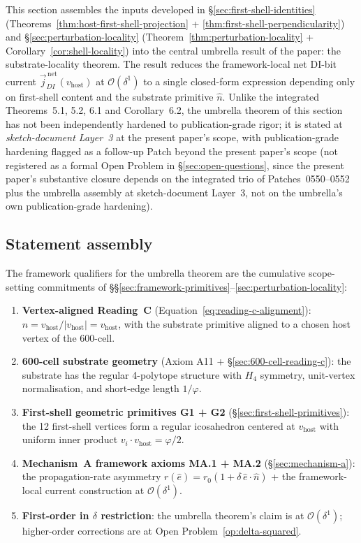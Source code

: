 \documentclass[11pt,letterpaper]{article}
\newcommand{\phig}{\varphi}
\newcommand{\vhost}{v_{\text{host}}}
\newcommand{\jDInet}{\vec{j}_{DI}^{\,\text{net}}}
\newcommand{\bigO}[1]{\mathcal{O}(#1)}
\begin{document}
This section assembles the inputs developed in \S\ref{sec:first-shell-identities} (Theorems~\ref{thm:host-first-shell-projection} + \ref{thm:first-shell-perpendicularity}) and \S\ref{sec:perturbation-locality} (Theorem~\ref{thm:perturbation-locality} + Corollary~\ref{cor:shell-locality}) into the central umbrella result of the paper: the substrate-locality theorem. The result reduces the framework-local net DI-bit current $\jDInet(\vhost)$ at $\bigO{\delta^1}$ to a single closed-form expression depending only on first-shell content and the substrate primitive $\hat{n}$. Unlike the integrated Theorems~5.1, 5.2, 6.1 and Corollary~6.2, the umbrella theorem of this section has not been independently hardened to publication-grade rigor; it is stated at \emph{sketch-document Layer~3} at the present paper's scope, with publication-grade hardening flagged as a follow-up Patch beyond the present paper's scope (not registered as a formal Open Problem in \S\ref{sec:open-questions}, since the present paper's substantive closure depends on the integrated trio of Patches~0550--0552 plus the umbrella assembly at sketch-document Layer~3, not on the umbrella's own publication-grade hardening).

\subsection{Statement assembly}
\label{sec:statement-assembly}

The framework qualifiers for the umbrella theorem are the cumulative scope-setting commitments of \S\S\ref{sec:framework-primitives}--\ref{sec:perturbation-locality}:

\begin{enumerate}[leftmargin=2em]
\item \textbf{Vertex-aligned Reading~C} (Equation~\eqref{eq:reading-c-alignment}): $\hat{n} = \vhost / |\vhost| = \vhost$, with the substrate primitive aligned to a chosen host vertex of the 600-cell.
\item \textbf{600-cell substrate geometry} (Axiom A11 + \S\ref{sec:600-cell-reading-c}): the substrate has the regular 4-polytope structure with $H_4$ symmetry, unit-vertex normalisation, and short-edge length $1/\phig$.
\item \textbf{First-shell geometric primitives G1 + G2} (\S\ref{sec:first-shell-primitives}): the 12 first-shell vertices form a regular icosahedron centered at $\vhost$ with uniform inner product $v_i \cdot \vhost = \phig/2$.
\item \textbf{Mechanism~A framework axioms MA.1 + MA.2} (\S\ref{sec:mechanism-a}): the propagation-rate asymmetry $r(\hat{e}) = r_0(1 + \delta \, \hat{e} \cdot \hat{n})$ + the framework-local current construction at $\bigO{\delta^1}$.
\item \textbf{First-order in $\delta$ restriction}: the umbrella theorem's claim is at $\bigO{\delta^1}$; higher-order corrections are at Open Problem~\ref{op:delta-squared}.
\end{enumerate}
\end{document}

